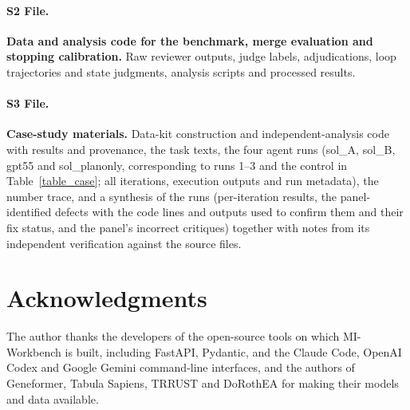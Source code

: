 \documentclass[10pt,letterpaper]{article}
\begin{document}
\paragraph*{S2 File.}
\label{S2_File}
{\bf Data and analysis code for the benchmark, merge evaluation and stopping calibration.} Raw reviewer outputs, judge labels, adjudications, loop trajectories and state judgments, analysis scripts and processed results.

\paragraph*{S3 File.}
\label{S3_File}
{\bf Case-study materials.} Data-kit construction and independent-analysis code with results and provenance, the task texts, the four agent runs (sol\_A, sol\_B, gpt55 and sol\_planonly, corresponding to runs 1--3 and the control in Table~\ref{table_case}; all iterations, execution outputs and run metadata), the number trace, and a synthesis of the runs (per-iteration results, the panel-identified defects with the code lines and outputs used to confirm them and their fix status, and the panel's incorrect critiques) together with notes from its independent verification against the source files.


\section*{Acknowledgments}
The author thanks the developers of the open-source tools on which MI-Workbench is built, including FastAPI, Pydantic, and the Claude Code, OpenAI Codex and Google Gemini command-line interfaces, and the authors of Geneformer, Tabula Sapiens, TRRUST and DoRothEA for making their models and data available.

\nolinenumbers
\end{document}

